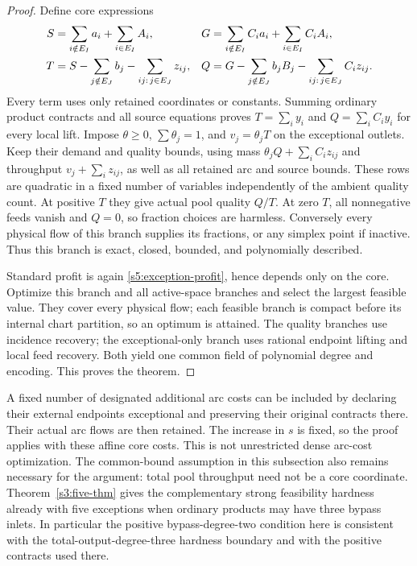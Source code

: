 \begin{proof}
Define core expressions
\begin{align}
 S&=\sum_{i\notin E_I}a_i+\sum_{i\in E_I}A_i,&
 G&=\sum_{i\notin E_I}C_i a_i+\sum_{i\in E_I}C_i A_i,\notag\\
 T&=S-\sum_{j\notin E_J}b_j-
                     \sum_{ij:\,j\in E_J}z_{ij},&
 Q&=G-\sum_{j\notin E_J}b_jB_j-
                     \sum_{ij:\,j\in E_J}C_i z_{ij}.
 \label{s5:exceptional-only-masses}
\end{align}
Every term uses only retained coordinates or constants. Summing
ordinary product contracts and all source equations proves
$T=\sum_i y_i$ and $Q=\sum_iC_i y_i$ for every local lift. Impose
$\theta\ge0$, $\sum\theta_j=1$, and $v_j=\theta_jT$ on the exceptional
outlets. Keep their demand and quality bounds, using mass
$\theta_jQ+\sum_iC_i z_{ij}$ and throughput $v_j+\sum_i z_{ij}$,
as well as all retained arc and source bounds. These rows are quadratic
in a fixed number of variables independently of the ambient quality
count. At positive $T$ they give actual pool quality $Q/T$. At zero
$T$, all nonnegative feeds vanish and $Q=0$, so fraction choices are
harmless. Conversely every physical flow of this branch supplies its
fractions, or any simplex point if inactive. Thus this branch is exact,
closed, bounded, and polynomially described.

Standard profit is again \eqref{s5:exception-profit}, hence depends
only on the core. Optimize this branch and all active-space branches
and select the largest feasible value. They cover every physical flow;
each feasible branch is compact before its internal chart partition,
so an optimum is attained. The quality branches use incidence recovery;
the exceptional-only branch uses rational endpoint lifting and local
feed recovery. Both yield one common field of polynomial degree and
encoding. This proves the theorem.
\end{proof}

A fixed number of designated additional arc costs can be included by
declaring their external endpoints exceptional and preserving their
original contracts there. Their actual arc flows are then retained.
The increase in $s$ is fixed, so the proof applies with these affine
core costs. This is not unrestricted dense arc-cost optimization.
The common-bound assumption in this subsection also remains necessary
for the argument: total pool throughput need not be a core coordinate.
Theorem~\ref{s3:five-thm} gives the complementary strong feasibility
hardness already with five exceptions when ordinary products may have
three bypass inlets. In particular the positive bypass-degree-two
condition here is consistent with the total-output-degree-three
hardness boundary and with the positive contracts used there.

